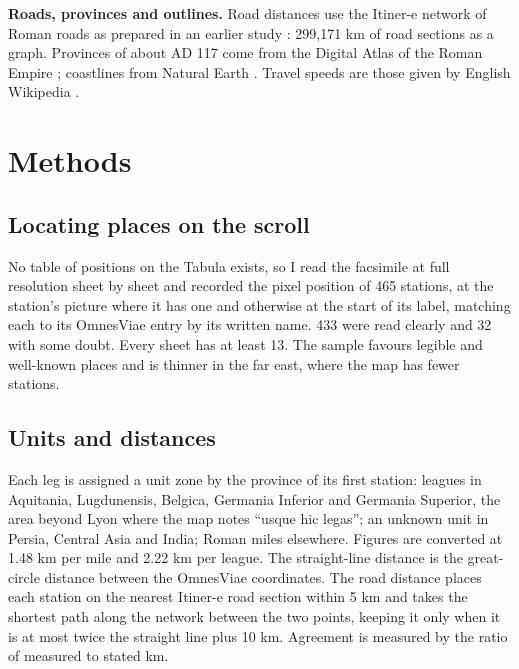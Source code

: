 \documentclass[11pt,a4paper]{article}
\begin{document}
\textbf{Roads, provinces and outlines.} Road distances use the Itiner-e network of Roman roads \citep{itinere} as prepared in an earlier study \citep{romanroads}: 299,171 km of road sections as a graph. Provinces of about AD 117 come from the Digital Atlas of the Roman Empire \citep{dare}; coastlines from Natural Earth \citep{naturalearth}. Travel speeds are those given by English Wikipedia \citep{wiki}.

\section{Methods}
\subsection{Locating places on the scroll}
No table of positions on the Tabula exists, so I read the facsimile at full resolution sheet by sheet and recorded the pixel position of 465 stations, at the station's picture where it has one and otherwise at the start of its label, matching each to its OmnesViae entry by its written name. 433 were read clearly and 32 with some doubt. Every sheet has at least 13. The sample favours legible and well-known places and is thinner in the far east, where the map has fewer stations.

\subsection{Units and distances}
Each leg is assigned a unit zone by the province of its first station: leagues in Aquitania, Lugdunensis, Belgica, Germania Inferior and Germania Superior, the area beyond Lyon where the map notes ``usque hic legas''; an unknown unit in Persia, Central Asia and India; Roman miles elsewhere. Figures are converted at 1.48 km per mile and 2.22 km per league. The straight-line distance is the great-circle distance between the OmnesViae coordinates. The road distance places each station on the nearest Itiner-e road section within 5 km and takes the shortest path along the network between the two points, keeping it only when it is at most twice the straight line plus 10 km. Agreement is measured by the ratio of measured to stated km.
\end{document}
